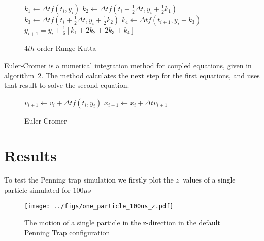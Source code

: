 \documentclass[english,notitlepage,reprint,nofootinbib]{revtex4-1}  %
\begin{document}
%
\begin{figure}
	\begin{algorithm}[H]
		\caption{$4th$ order Runge-Kutta}
		\label{algo:rk4}
		\begin{algorithmic}
			\State $k_1 \leftarrow \Delta t f(t_i, y_i)$  
			\State $k_2 \leftarrow \Delta t f(t_i + \frac{1}{2}\Delta t, y_i + \frac{1}{2}k_1)$
			\State $k_3 \leftarrow \Delta t f(t_i + \frac{1}{2}\Delta t, y_i + \frac{1}{2}k_2) $
			\State $k_4 \leftarrow \Delta t f(t_{i+1}, y_i + k_3)$
			\State $y_{i+1} = y_i + \frac{1}{6}[k_1 + 2k_2 + 2k_3 + k_4]$
			\EndProcedure
		\end{algorithmic}
	\end{algorithm}
\end{figure}
Euler-Cromer is a numerical integration method for coupled equations, given in algorithm~\ref{algo:ec}. The method calculates the next step for the first equations, and uses that result to solve the second equation.
\begin{figure}
	\begin{algorithm}[H]
		\caption{Euler-Cromer}
		\label{algo:ec}
		\begin{algorithmic}
			\Procedure{EC}{$v, x, \Delta t, f$}
			\State $v_{i+1} \leftarrow v_i + \Delta t f(t_i, y_i)$
			\State $x_{i+1} \leftarrow x_i + \Delta t v_{i+1}$
			\EndProcedure
		\end{algorithmic}
	\end{algorithm}
\end{figure}

\section{Results}\label{sec:results}
%
To test the Penning trap simulation we firstly plot the $z$ values of a single particle simulated for $100 \mu s$

\begin{figure}[h!]
	\centering
	\texttt{[image: ../figs/one\_particle\_100us\_z.pdf]} %
	\caption{The motion of a single particle in the z-direction in the default Penning Trap configuration}
	\label{fig:100us-z}
\end{figure}
\end{document}
